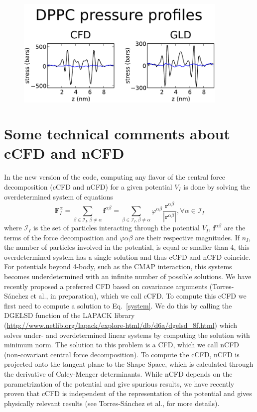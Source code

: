 \documentclass[10pt,letterpaper,notitlepage]{article}
\begin{document}
\begin{figure}[h]
\centering
\includegraphics[width=4in]{figs/CFD_GL.pdf}
\caption{}
\end{figure}

\section{Some technical comments about cCFD and nCFD}

In the new version of the code, computing any flavor of the central force decomposition (cCFD and nCFD) for a given potential $V_I$ is done by solving the overdetermined system of equations
\begin{equation}
\label{system}
\bm{F}_I^\alpha = \sum_{\beta\in\mathcal{I}_I,\beta\neq\alpha}  \bm{f}^{\alpha\beta}= \sum_{\beta\in\mathcal{I}_I,\beta\neq\alpha}  \varphi^{\alpha\beta}\frac{\bm{r}^{\alpha\beta}}{|\bm{r}^{\alpha\beta}|}, \forall \alpha \in \mathcal{I}_I
\end{equation}
where $\mathcal{I}_I$ is the set of particles interacting through the potential $V_I$, $\bm{f}^{\alpha\beta}$ are the terms of the force decomposition and $\varphi{\alpha\beta}$ are their respective magnitudes. If $n_I$, the number of particles involved in the potential, is equal or smaller than 4, this overdetermined system has a single solution and thus cCFD and nCFD coincide. For potentials beyond 4-body, such as the CMAP interaction, this systems becomes underdetermined with an infinite number of possible solutions. We have recently proposed a preferred CFD based on covariance arguments (Torres-S\'anchez et al., in preparation), which we call cCFD. To compute this cCFD we first need to compute a solution to Eq.~\eqref{system}. We do this by calling the DGELSD function of the LAPACK library (\url{http://www.netlib.org/lapack/explore-html/db/d6a/dgelsd_8f.html}) which solves under- and overdetermined linear systems by computing the solution with minimum norm. The solution to this problem is a CFD, which we call nCFD (non-covariant central force decomposition). To compute the cCFD, nCFD is projected onto the tangent plane to the Shape Space, which is calculated through the derivative of Caley-Menger determinants. While nCFD depends on the parametrization of the potential and give spurious results, we have recently proven that cCFD is independent of the representation of the potential and gives physically relevant results (see Torres-S\'anchez et al., for more details). 
\end{document}
